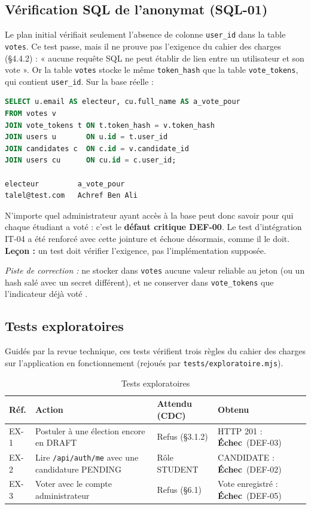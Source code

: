 \documentclass[12pt,a4paper]{report}
\newcommand{\ko}{\textcolor{kored}{\textbf{Échec}}}
\begin{document}
\subsection{Vérification SQL de l'anonymat (SQL-01)}\label{sec:anonymat}
Le plan initial vérifiait seulement l'absence de colonne \texttt{user\_id} dans la table \texttt{votes}. Ce test passe, mais il ne prouve pas l'exigence du cahier des charges (§4.4.2) : « aucune requête SQL ne peut établir de lien entre un utilisateur et son vote ». Or la table \texttt{votes} stocke le même \texttt{token\_hash} que la table \texttt{vote\_tokens}, qui contient \texttt{user\_id}. Sur la base réelle :
\begin{lstlisting}[language=SQL,caption={Requête SQL de ré-identification d'un vote}]
SELECT u.email AS electeur, cu.full_name AS a_vote_pour
FROM votes v
JOIN vote_tokens t ON t.token_hash = v.token_hash
JOIN users u       ON u.id = t.user_id
JOIN candidates c  ON c.id = v.candidate_id
JOIN users cu      ON cu.id = c.user_id;

electeur         a_vote_pour
talel@test.com   Achref Ben Ali
\end{lstlisting}
N'importe quel administrateur ayant accès à la base peut donc savoir pour qui chaque étudiant a voté : c'est le \textbf{défaut critique DEF-00}. Le test d'intégration IT-04 a été renforcé avec cette jointure et échoue désormais, comme il le doit. \textbf{Leçon :} un test doit vérifier l'exigence, pas l'implémentation supposée.

\textit{Piste de correction :} ne stocker dans \texttt{votes} aucune valeur reliable au jeton (ou un hash salé avec un secret différent), et ne conserver dans \texttt{vote\_tokens} que l'indicateur \og déjà voté \fg.

\subsection{Tests exploratoires}\label{sec:explo}
Guidés par la revue technique, ces tests vérifient trois règles du cahier des charges sur l'application en fonctionnement (rejoués par \texttt{tests/exploratoire.mjs}).
\begin{table}[H]
\centering
\caption{Tests exploratoires}
\small
\begin{tabularx}{\textwidth}{@{}lXp{3.6cm}p{3.2cm}@{}}
\toprule
\rowcolor{evlight}\textbf{Réf.} & \textbf{Action} & \textbf{Attendu (CDC)} & \textbf{Obtenu}\\
\midrule
EX-1 & Postuler à une élection encore en DRAFT & Refus (§3.1.2) & HTTP 201 : \ko\ (DEF-03)\\
EX-2 & Lire \texttt{/api/auth/me} avec une candidature PENDING & Rôle STUDENT & CANDIDATE : \ko\ (DEF-02)\\
EX-3 & Voter avec le compte administrateur & Refus (§6.1) & Vote enregistré : \ko\ (DEF-05)\\
\bottomrule
\end{tabularx}
\end{table}
\end{document}
